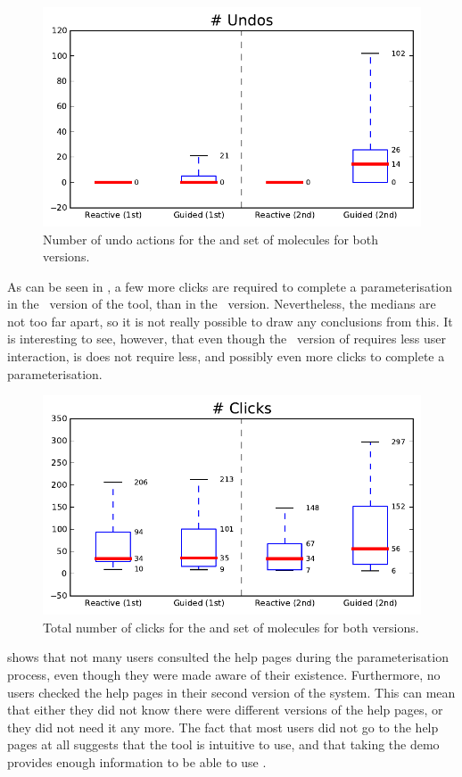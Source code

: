 \begin{figure}[h!]
\center
\includegraphics[width=.6\textwidth]{img/graphs/1a_10.pdf}
\caption{Number of undo actions for the  and  set of molecules for both versions.}
\end{figure}

As can be seen in , a few more clicks are required to complete a parameterisation in the \IDb\ version of the tool, than in the \IDa\ version. Nevertheless, the medians are not too far apart, so it is not really possible to draw any conclusions from this. It is interesting to see, however, that even though the \IDb\ version of \oframp{} requires less user interaction, is does not require less, and possibly even more clicks to complete a parameterisation.

\begin{figure}[h!]
\center
\includegraphics[width=.6\textwidth]{img/graphs/1a_04.pdf}
\caption{Total number of clicks for the  and  set of molecules for both versions.}
\end{figure}

 shows that not many users consulted the help pages during the parameterisation process, even though they were made aware of their existence. Furthermore, no users checked the help pages in their second version of the system. This can mean that either they did not know there were different versions of the help pages, or they did not need it any more. The fact that most users did not go to the help pages at all suggests that the tool is intuitive to use, and that taking the demo provides enough information to be able to use \oframp.

